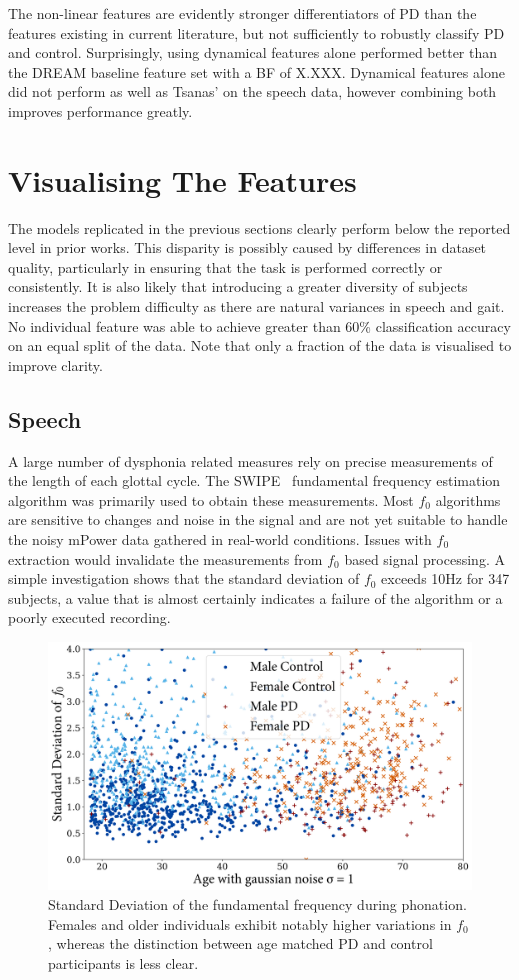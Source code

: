\documentclass[12pt, twoside]{book}
\begin{document}
The non-linear features are evidently stronger differentiators of PD than the features existing in current literature, but not sufficiently to robustly classify PD and control. Surprisingly, using dynamical features alone performed better than the DREAM baseline feature set with a BF of X.XXX. Dynamical features alone did not perform as well as Tsanas' on the speech data, however combining both improves performance greatly.

\section{Visualising The Features}
The models replicated in the previous sections clearly perform below the reported level in prior works. This disparity is possibly caused by differences in dataset quality, particularly in ensuring that the task is performed correctly or consistently. It is also likely that introducing a greater diversity of subjects increases the problem difficulty as there are natural variances in speech and gait. No individual feature was able to achieve greater than 60\% classification accuracy on an equal split of the data. Note that only a fraction of the data is visualised to improve clarity. 

\subsection{Speech}
A large number of dysphonia related measures rely on precise measurements of the length of each glottal cycle. The SWIPE~\cite{camacho2007swipe} fundamental frequency estimation algorithm was primarily used to obtain these measurements. Most $f_0$ algorithms are sensitive to changes and noise in the signal and are not yet suitable to handle the noisy mPower data gathered in real-world conditions. Issues with $f_0$ extraction would invalidate the measurements from $f_0$ based signal processing. A simple investigation shows that the standard deviation of $f_0$ exceeds 10Hz for 347 subjects, a value that is almost certainly indicates a failure of the algorithm or a poorly executed recording.

\begin{figure}[h]
	\caption{Standard Deviation of the fundamental frequency during phonation. Females and older individuals exhibit notably higher variations in $f_0$, whereas the distinction between age matched PD and control participants is less clear.}
	\label{stdevf0}
	\centering\includegraphics[width=0.75\linewidth]{f0stdev.png}
\end{figure}
\end{document}
